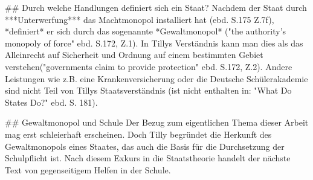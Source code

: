 ## Durch welche Handlungen definiert sich ein Staat?
Nachdem der Staat durch ***Unterwerfung*** das Machtmonopol installiert hat (ebd. S.175 Z.7f), *definiert* er sich durch das sogenannte *Gewaltmonopol* ("the authority's monopoly of force" ebd. S.172, Z.1).
In Tillys Verständnis kann man dies als das Alleinrecht auf Sicherheit und Ordnung auf einem bestimmten Gebiet verstehen("governments claim to provide protection" ebd. S.172, Z.2).
Andere Leistungen wie z.B. eine Krankenversicherung oder die Deutsche Schülerakademie sind nicht Teil von Tillys Staatsverständnis (ist nicht enthalten in: "What Do States Do?" ebd. S. 181).

## Gewaltmonopol und Schule
Der Bezug zum eigentlichen Thema dieser Arbeit mag erst schleierhaft erscheinen.
Doch Tilly begründet die Herkunft des Gewaltmonopols eines Staates, das auch die Basis für die Durchsetzung der Schulpflicht ist.
Nach diesem Exkurs in die Staatstheorie handelt der nächste Text von gegenseitigem Helfen in der Schule.
